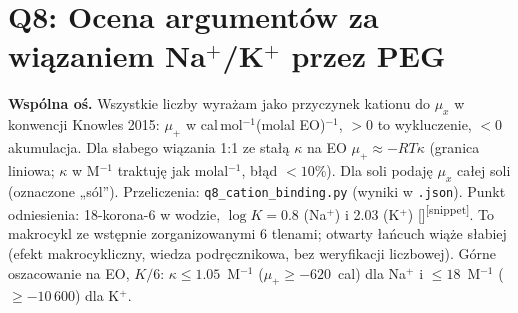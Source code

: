 \documentclass[10pt,a4paper]{article}
\newcommand{\citone}[1]{\citsep\ref{#1}\gdef\citsep{,\,}}
\newcommand{\cit}[1]{[\gdef\citsep{}\forcsvlist{\citone}{#1}]}
\begin{document}
\section{Q8: Ocena argumentów za wiązaniem Na$^+$/K$^+$ przez PEG}\label{sec:q8}
\textbf{Wspólna oś.} Wszystkie liczby wyrażam jako przyczynek kationu do $\mu_x$ w konwencji Knowles 2015: $\mu_+$ w cal\,mol$^{-1}$(molal EO)$^{-1}$, $>0$ to wykluczenie, $<0$ akumulacja. Dla słabego wiązania 1:1 ze stałą $\kappa$ na EO $\mu_+\approx-RT\kappa$ (granica liniowa; $\kappa$ w M$^{-1}$ traktuję jak molal$^{-1}$, błąd $<10$\%). Dla soli podaję $\mu_x$ całej soli (oznaczone „sól”). Przeliczenia: \texttt{q8\_cation\_binding.py} (wyniki w \texttt{.json}). Punkt odniesienia: 18-korona-6 w wodzie, $\log K=0.8$ (Na$^+$) i 2.03 (K$^+$) \cit{b:canj86}\textsuperscript{[snippet]}. To makrocykl ze wstępnie zorganizowanymi 6 tlenami; otwarty łańcuch wiąże słabiej (efekt makrocykliczny, wiedza podręcznikowa, bez weryfikacji liczbowej). Górne oszacowanie na EO, $K/6$: $\kappa\le1.05$~M$^{-1}$ ($\mu_+\ge-620$~cal) dla Na$^+$ i $\le18$~M$^{-1}$ ($\ge-10\,600$) dla K$^+$.
\end{document}
